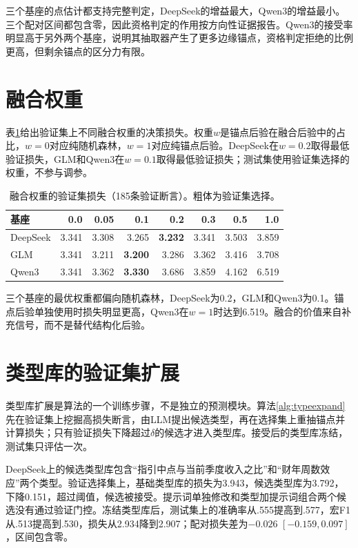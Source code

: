三个基座的点估计都支持完整判定，DeepSeek的增益最大，Qwen3的增益最小。三个配对区间都包含零，因此资格判定的作用按方向性证据报告。Qwen3的接受率明显高于另外两个基座，说明其抽取器产生了更多边缘锚点，资格判定拒绝的比例更高，但剩余锚点的区分力有限。

\section{融合权重}

表\ref{tab:weight}给出验证集上不同融合权重的决策损失。权重$w$是锚点后验在融合后验中的占比，$w=0$对应纯随机森林，$w=1$对应纯锚点后验。DeepSeek在$w=0.2$取得最低验证损失，GLM和Qwen3在$w=0.1$取得最低验证损失；测试集使用验证集选择的权重，不参与调参。

\begin{table}[htbp]
\centering
{}
\setlength{\tabcolsep}{4pt}
\caption{融合权重的验证集损失（185条验证断言）。粗体为验证集选择。}
\label{tab:weight}
\begin{tabular}{lrrrrrrr}
\toprule
基座 & 0.0 & 0.05 & 0.1 & 0.2 & 0.3 & 0.5 & 1.0 \\
\midrule
DeepSeek & 3.341 & 3.308 & 3.265 & \textbf{3.232} & 3.341 & 3.503 & 3.859 \\
GLM & 3.341 & 3.211 & \textbf{3.200} & 3.286 & 3.362 & 3.416 & 3.708 \\
Qwen3 & 3.341 & 3.362 & \textbf{3.330} & 3.686 & 3.859 & 4.162 & 6.519 \\
\bottomrule
\end{tabular}
\end{table}

三个基座的最优权重都偏向随机森林，DeepSeek为0.2，GLM和Qwen3为0.1。锚点后验单独使用时损失明显更高，Qwen3在$w=1$时达到6.519。融合的价值来自补充信号，而不是替代结构化后验。

\section{类型库的验证集扩展}

类型库扩展是算法的一个训练步骤，不是独立的预测模块。算法\ref{alg:typeexpand}先在验证集上挖掘高损失断言，由LLM提出候选类型，再在选择集上重抽锚点并计算损失；只有验证损失下降超过$\delta$的候选才进入类型库。接受后的类型库冻结，测试集只评估一次。


DeepSeek上的候选类型库包含“指引中点与当前季度收入之比”和“财年周数效应”两个类型。验证选择集上，基础类型库的损失为3.943，候选类型库为3.792，下降0.151，超过阈值，候选被接受。提示词单独修改和类型加提示词组合两个候选没有通过验证门控。冻结类型库后，测试集上的准确率从.555提高到.577，宏F1从.513提高到.530，损失从2.934降到2.907；配对损失差为$-0.026$ $[-0.159,0.097]$，区间包含零。

